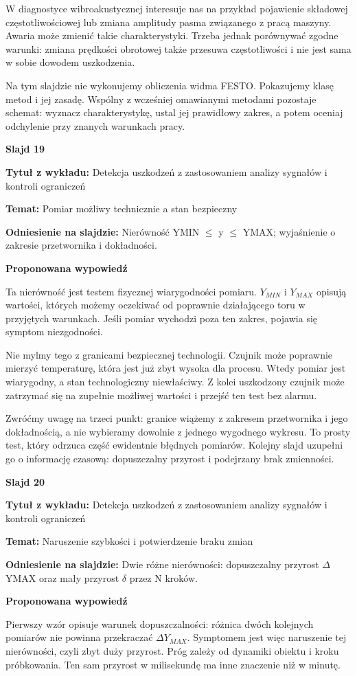 \documentclass[a4paper,11pt]{article}
\newcommand{\NumerSlajdu}{1}
\newcommand{\Komentarz}[3]{%
  \gdef\NumerSlajdu{#1}%
  {\Large\bfseries Slajd #1\par}\smallskip
  \textbf{Tytuł z wykładu:} #2\par
  \textbf{Temat:} #3\par\medskip
}
\begin{document}
W diagnostyce wibroakustycznej interesuje nas na przykład pojawienie składowej częstotliwościowej lub zmiana amplitudy pasma związanego z pracą maszyny. Awaria może zmienić takie charakterystyki. Trzeba jednak porównywać zgodne warunki: zmiana prędkości obrotowej także przesuwa częstotliwości i nie jest sama w sobie dowodem uszkodzenia.

Na tym slajdzie nie wykonujemy obliczenia widma FESTO. Pokazujemy klasę metod i jej zasadę. Wspólny z wcześniej omawianymi metodami pozostaje schemat: wyznacz charakterystykę, ustal jej prawidłowy zakres, a potem oceniaj odchylenie przy znanych warunkach pracy.
\clearpage

\Komentarz{19}{Detekcja uszkodzeń z zastosowaniem analizy sygnałów i kontroli ograniczeń}{Pomiar możliwy technicznie a stan bezpieczny}
{\small\color{black!65}\textbf{Odniesienie na slajdzie:} Nierówność YMIN \ensuremath{\leq} y \ensuremath{\leq} YMAX; wyjaśnienie o zakresie przetwornika i dokładności.\par}
\medskip
\textbf{Proponowana wypowiedź}\par
Ta nierówność jest testem fizycznej wiarygodności pomiaru. $Y_{MIN}$ i $Y_{MAX}$ opisują wartości, których możemy oczekiwać od poprawnie działającego toru w przyjętych warunkach. Jeśli pomiar wychodzi poza ten zakres, pojawia się symptom niezgodności.

Nie mylmy tego z granicami bezpiecznej technologii. Czujnik może poprawnie mierzyć temperaturę, która jest już zbyt wysoka dla procesu. Wtedy pomiar jest wiarygodny, a stan technologiczny niewłaściwy. Z kolei uszkodzony czujnik może zatrzymać się na zupełnie możliwej wartości i przejść ten test bez alarmu.

Zwróćmy uwagę na trzeci punkt: granice wiążemy z zakresem przetwornika i jego dokładnością, a nie wybieramy dowolnie z jednego wygodnego wykresu. To prosty test, który odrzuca część ewidentnie błędnych pomiarów. Kolejny slajd uzupełni go o informację czasową: dopuszczalny przyrost i podejrzany brak zmienności.
\clearpage

\Komentarz{20}{Detekcja uszkodzeń z zastosowaniem analizy sygnałów i kontroli ograniczeń}{Naruszenie szybkości i potwierdzenie braku zmian}
{\small\color{black!65}\textbf{Odniesienie na slajdzie:} Dwie różne nierówności: dopuszczalny przyrost \ensuremath{\Delta}YMAX oraz mały przyrost \ensuremath{\delta} przez N kroków.\par}
\medskip
\textbf{Proponowana wypowiedź}\par
Pierwszy wzór opisuje warunek dopuszczalności: różnica dwóch kolejnych pomiarów nie powinna przekraczać $\Delta Y_{MAX}$. Symptomem jest więc naruszenie tej nierówności, czyli zbyt duży przyrost. Próg zależy od dynamiki obiektu i kroku próbkowania. Ten sam przyrost w milisekundę ma inne znaczenie niż w minutę.
\end{document}
